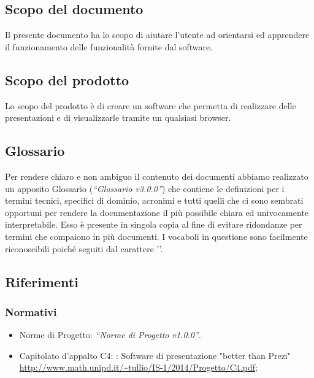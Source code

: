 \subsection{Scopo del documento}
Il presente documento ha lo scopo di aiutare l'utente ad orientarsi ed apprendere il funzionamento delle funzionalità fornite dal software.
\subsection{Scopo del prodotto}
Lo scopo del prodotto è di creare un software che permetta di realizzare delle presentazioni e di visualizzarle tramite un qualsiasi browser.
\subsection{Glossario}
Per rendere chiaro e non ambiguo il contenuto dei documenti abbiamo realizzato un apposito Glossario (\textit{“Glossario v3.0.0”}) che contiene le definizioni per i termini tecnici, specifici di dominio, acronimi e tutti quelli che ci sono sembrati opportuni per rendere la documentazione il più possibile chiara ed univocamente interpretabile. Esso è presente in singola copia al fine di evitare ridondanze per termini che compaiono in più documenti.
I vocaboli in questione sono facilmente riconoscibili poiché seguiti dal carattere ''.
\subsection{Riferimenti}
\subsubsection{Normativi}
\begin{itemize}
	\item Norme di Progetto: \textit{“Norme di Progetto v1.0.0”}.
	\item Capitolato d’appalto C4: \PROGETTO: Software di presentazione "better than Prezi" \\ \url{http://www.math.unipd.it/~tullio/IS-1/2014/Progetto/C4.pdf};
\end{itemize}
